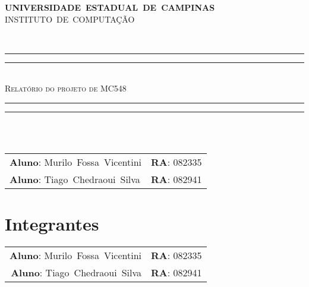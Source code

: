 \documentclass[11pt,letterpaper]{article}
\begin{document}
  \thispagestyle{empty}
  
  \begin{minipage}[h]{0.10\linewidth}
  \end{minipage}
  \begin{minipage}[h!]{0.7\linewidth}
    \vspace*{\fill}
    \centering
    {\large \textbf{UNIVERSIDADE~ESTADUAL~DE~CAMPINAS}}\\ 
    {\large INSTITUTO~DE~COMPUTAÇÃO}                   
    \vspace*{\fill} 
  \end{minipage}
    \\\vspace{0.5cm}
  
  \begin{center} 
    \rule{11.0cm}{0.4pt}\vspace*{-\baselineskip}\vspace{-2.0pt}
    \rule{11.0cm}{1.6pt} \vspace*{1.0pt}\\
      {\Large \textsc{Relatório do projeto de MC548}}\\
	\vspace*{-\baselineskip}\vspace{4.2pt} \rule{11.0cm}{0.4pt}
	\vspace*{-\baselineskip}\vspace{3.2pt} \rule{11.0cm}{1.6pt}\\
    {\textsl{}}
    \\\vspace{1cm}
    \begin{tabular}{ll}
   \textbf{Aluno}:   Murilo~Fossa~Vicentini &
      \textbf{RA}:          082335 \\ 
      \textbf{Aluno}:        Tiago~Chedraoui~Silva & 
      \textbf{RA}:        082941 \\
    \end{tabular}
  \end{center}
  \vspace{0.5cm}

  \tableofcontents

\vspace{2mm}
\newpage

\section{Integrantes}
   \begin{tabular}{rl}
      \textbf{Aluno}:   Murilo~Fossa~Vicentini &
      \textbf{RA}:          082335 \\ 
      \textbf{Aluno}:        Tiago~Chedraoui~Silva & 
      \textbf{RA}:        082941 \\
    \end{tabular}
\end{document}
